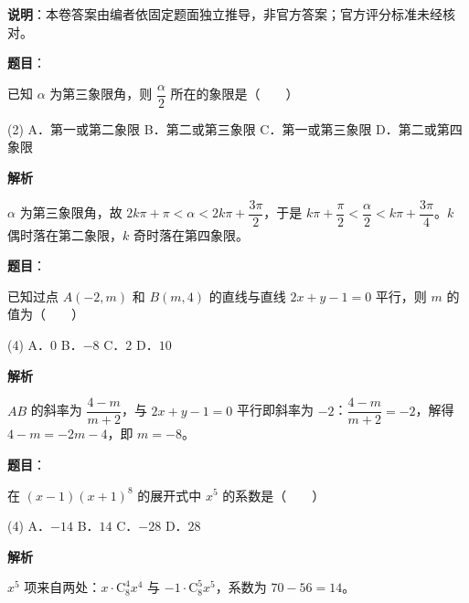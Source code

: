 
\textbf{说明}：本卷答案由编者依固定题面独立推导，非官方答案；官方评分标准未经核对。

\begin{answer}

\textbf{题目}：

已知 $\alpha$ 为第三象限角，则 $\dfrac{\alpha}{2}$ 所在的象限是\mbox{（　　）}

\begin{gkopts}(2)
\task A．第一或第二象限
\task B．第二或第三象限
\task C．第一或第三象限
\task D．第二或第四象限
\end{gkopts}

\textbf{解析}

$\alpha$ 为第三象限角，故 $2k\pi + \pi < \alpha < 2k\pi + \dfrac{3\pi}{2}$，于是 $k\pi + \dfrac{\pi}{2} < \dfrac{\alpha}{2} < k\pi + \dfrac{3\pi}{4}$。$k$ 偶时落在第二象限，$k$ 奇时落在第四象限。


\end{answer}
\begin{answer}

\textbf{题目}：

已知过点 $A(-2, m)$ 和 $B(m, 4)$ 的直线与直线 $2x + y - 1 = 0$ 平行，则 $m$ 的值为\mbox{（　　）}

\begin{gkopts}(4)
\task A．$0$
\task B．$-8$
\task C．$2$
\task D．$10$
\end{gkopts}

\textbf{解析}

$AB$ 的斜率为 $\dfrac{4 - m}{m + 2}$，与 $2x + y - 1 = 0$ 平行即斜率为 $-2$：$\dfrac{4-m}{m+2} = -2$，解得 $4 - m = -2m - 4$，即 $m = -8$。


\end{answer}
\begin{answer}

\textbf{题目}：

在 $(x - 1)(x + 1)^8$ 的展开式中 $x^5$ 的系数是\mbox{（　　）}

\begin{gkopts}(4)
\task A．$-14$
\task B．$14$
\task C．$-28$
\task D．$28$
\end{gkopts}

\textbf{解析}

$x^5$ 项来自两处：$x \cdot \mathrm{C}_8^4 x^4$ 与 $-1 \cdot \mathrm{C}_8^5 x^5$，系数为 $70 - 56 = 14$。


\end{answer}
